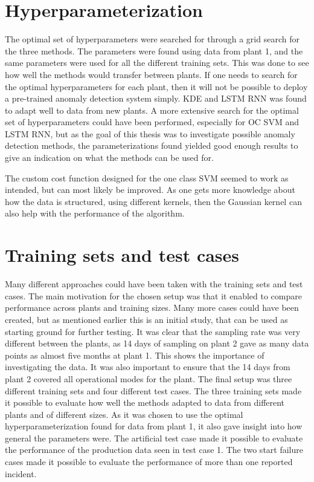 \section{Hyperparameterization}
    The optimal set of hyperparameters were searched for through a grid search for the three methods. The parameters were found using data from plant 1, and the same parameters were used for all the different training sets. This was done to see how well the methods would transfer between plants. If one needs to search for the optimal hyperparameters for each plant, then it will not be possible to deploy a pre-trained anomaly detection system simply. KDE and LSTM RNN was found to adapt well to data from new plants. A more extensive search for the optimal set of hyperparameters could have been performed, especially for OC SVM and LSTM RNN, but as the goal of this thesis was to investigate possible anomaly detection methods, the parameterizations found yielded good enough results to give an indication on what the methods can be used for.
    
    The custom cost function designed for the one class SVM seemed to work as intended, but can most likely be improved. As one gets more knowledge about how the data is structured, using different kernels, then the Gaussian kernel can also help with the performance of the algorithm.

\section{Training sets and test cases}
    Many different approaches could have been taken with the training sets and test cases. The main motivation for the chosen setup was that it enabled to compare performance across plants and training sizes. Many more cases could have been created, but as mentioned earlier this is an initial study, that can be used as starting ground for further testing. It was clear that the sampling rate was very different between the plants, as 14 days of sampling on plant 2 gave as many data points as almost five months at plant 1. This shows the importance of investigating the data. It was also important to ensure that the 14 days from plant 2 covered all operational modes for the plant. The final setup was three different training sets and four different test cases. The three training sets made it possible to evaluate how well the methods adapted to data from different plants and of different sizes. As it was chosen to use the optimal hyperparameterization found for data from plant 1, it also gave insight into how general the parameters were. The artificial test case made it possible to evaluate the performance of the production data seen in test case 1. The two start failure cases made it possible to evaluate the performance of more than one reported incident. 


